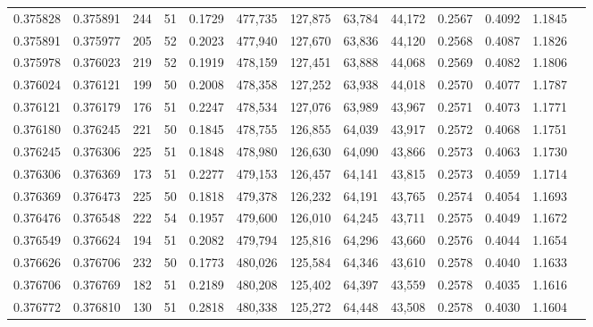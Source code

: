 \begin{tabular}{rrrrrrrrrrrrr}
0.375828 & 0.375891 &   244 &  51 &                                     0.1729 & 477,735 & 127,875 &  63,784 &  44,172 & 0.2567 & 0.4092 & 1.1845 \\
0.375891 & 0.375977 &   205 &  52 &                                     0.2023 & 477,940 & 127,670 &  63,836 &  44,120 & 0.2568 & 0.4087 & 1.1826 \\
0.375978 & 0.376023 &   219 &  52 &                                     0.1919 & 478,159 & 127,451 &  63,888 &  44,068 & 0.2569 & 0.4082 & 1.1806 \\
0.376024 & 0.376121 &   199 &  50 &                                     0.2008 & 478,358 & 127,252 &  63,938 &  44,018 & 0.2570 & 0.4077 & 1.1787 \\
0.376121 & 0.376179 &   176 &  51 &                                     0.2247 & 478,534 & 127,076 &  63,989 &  43,967 & 0.2571 & 0.4073 & 1.1771 \\
0.376180 & 0.376245 &   221 &  50 &                                     0.1845 & 478,755 & 126,855 &  64,039 &  43,917 & 0.2572 & 0.4068 & 1.1751 \\
0.376245 & 0.376306 &   225 &  51 &                                     0.1848 & 478,980 & 126,630 &  64,090 &  43,866 & 0.2573 & 0.4063 & 1.1730 \\
0.376306 & 0.376369 &   173 &  51 &                                     0.2277 & 479,153 & 126,457 &  64,141 &  43,815 & 0.2573 & 0.4059 & 1.1714 \\
0.376369 & 0.376473 &   225 &  50 &                                     0.1818 & 479,378 & 126,232 &  64,191 &  43,765 & 0.2574 & 0.4054 & 1.1693 \\
0.376476 & 0.376548 &   222 &  54 &                                     0.1957 & 479,600 & 126,010 &  64,245 &  43,711 & 0.2575 & 0.4049 & 1.1672 \\
0.376549 & 0.376624 &   194 &  51 &                                     0.2082 & 479,794 & 125,816 &  64,296 &  43,660 & 0.2576 & 0.4044 & 1.1654 \\
0.376626 & 0.376706 &   232 &  50 &                                     0.1773 & 480,026 & 125,584 &  64,346 &  43,610 & 0.2578 & 0.4040 & 1.1633 \\
0.376706 & 0.376769 &   182 &  51 &                                     0.2189 & 480,208 & 125,402 &  64,397 &  43,559 & 0.2578 & 0.4035 & 1.1616 \\
0.376772 & 0.376810 &   130 &  51 &                                     0.2818 & 480,338 & 125,272 &  64,448 &  43,508 & 0.2578 & 0.4030 & 1.1604 \\

\end{tabular}
